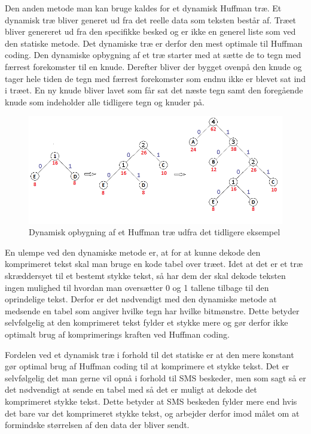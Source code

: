 Den anden metode man kan bruge kaldes for et dynamisk Huffman træ. Et dynamisk træ bliver generet ud fra det reelle data som teksten består af. Træet bliver genereret ud fra den specifikke besked og er ikke en generel liste som ved den statiske metode. Det dynamiske træ er derfor den mest optimale til Huffman coding. Den dynamiske opbygning af et træ starter med at sætte de to tegn med færrest forekomster til en knude. Derefter bliver der bygget ovenpå den knude og tager hele tiden de tegn med færrest forekomster som endnu ikke er blevet sat ind i træet. En ny knude bliver lavet som får sat det næste tegn samt den foregående knude som indeholder alle tidligere tegn og knuder på.

\begin{figure}[H]
\centering
\includegraphics[width=\linewidth]{Billeder/dynamisk.png}
\caption{Dynamisk opbygning af et Huffman træ udfra det tidligere eksempel}
\label{fig:dynamic_tree}
\end{figure}

En ulempe ved den dynamiske metode er, at for at kunne dekode den komprimeret tekst  skal man bruge en kode tabel over træet. Idet at det er et træ skræddersyet til et bestemt stykke tekst, så har dem der skal dekode teksten ingen mulighed til hvordan man oversætter 0 og 1 tallene tilbage til den oprindelige tekst. Derfor er det nødvendigt med den dynamiske metode at medsende en tabel som angiver hvilke tegn har hvilke bitmønstre. Dette betyder selvfølgelig at den komprimeret tekst fylder et stykke mere og gør derfor ikke optimalt brug af komprimerings kraften ved Huffman coding. \cite{Hufftree_4}

Fordelen ved et dynamisk træ i forhold til det statiske er at den mere konstant gør optimal brug af Huffman coding til at komprimere et stykke tekst. Det er selvfølgelig det man gerne vil opnå i forhold til SMS beskeder, men som sagt så er det nødvendigt at sende en tabel med så det er muligt at dekode det komprimeret stykke tekst. Dette betyder at SMS beskeden fylder mere end hvis det bare var det komprimeret stykke tekst, og arbejder derfor imod målet om at formindske størrelsen af den data der bliver sendt.